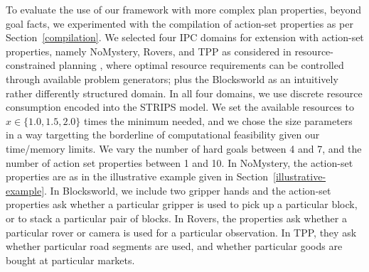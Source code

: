 To evaluate the use of our framework with more complex plan
properties, beyond goal facts, we experimented with the compilation of
action-set properties as per Section~\ref{compilation}. We selected
four IPC domains for extension with action-set properties, namely
NoMystery, Rovers, and TPP as considered in resource-constrained
planning \cite{nakhost:etal:icaps-12}, where optimal resource
requirements can be controlled through available problem generators;
plus the Blocksworld as an intuitively rather differently structured
domain. In all four domains, we use discrete resource consumption
encoded into the STRIPS model. We set the available resources to
$x \in \{1.0,1.5, 2.0\}$ times the minimum needed, and we chose the
size parameters in a way targetting the borderline of computational
feasibility given our time/memory limits. We vary the number of hard
goals between 4 and 7, and the number of action set properties between
1 and 10. In NoMystery, the action-set properties are as in the
illustrative example given in Section~\ref{illustrative-example}. In
Blocksworld, we include two gripper hands and the action-set
properties ask whether a particular gripper is used to pick up a
particular block, or to stack a particular pair of blocks. In Rovers,
the properties ask whether a particular rover or camera is used for a
particular observation. In TPP, they ask whether particular road
segments are used, and whether particular goods are bought at
particular markets.


